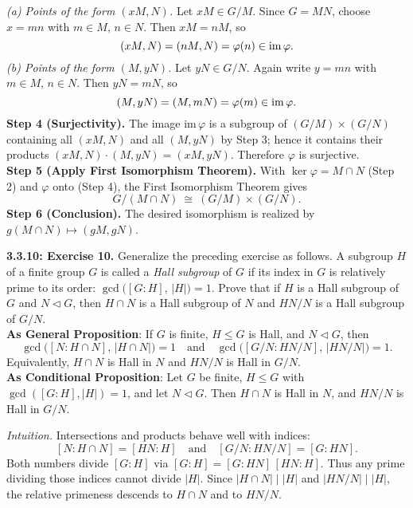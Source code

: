 \documentclass[12pt]{article}
\theoremstyle{definition}
\begin{document}
\quad\textit{(a) Points of the form $(xM,N)$.} Let $xM\in G/M$. Since $G=MN$, choose $x=mn$ with $m\in M$, $n\in N$. Then $xM=nM$, so
\[
(xM,N)=(nM,N)=\varphi(n)\in\mathrm{im}\,\varphi.\\
\]
\quad\textit{(b) Points of the form $(M,yN)$.} Let $yN\in G/N$. Again write $y=mn$ with $m\in M$, $n\in N$. Then $yN=mN$, so
\[
(M,yN)=(M,mN)=\varphi(m)\in\mathrm{im}\,\varphi.\\
\]
\textbf{Step 4 (Surjectivity).} The image $\mathrm{im}\,\varphi$ is a subgroup of $(G/M)\times(G/N)$ containing all $(xM,N)$ and all $(M,yN)$ by Step 3; hence it contains their products $(xM,N)\cdot(M,yN)=(xM,yN)$. Therefore $\varphi$ is surjective.\\
\textbf{Step 5 (Apply First Isomorphism Theorem).} With $\ker\varphi=M\cap N$ (Step 2) and $\varphi$ onto (Step 4), the First Isomorphism Theorem gives
\[
G/(M\cap N)\ \cong\ (G/M)\times(G/N).
\]
\textbf{Step 6 (Conclusion).} The desired isomorphism is realized by $g(M\cap N)\longmapsto (gM,gN)$.\\

\newpage

\newpage

\noindent \textbf{3.3.10: Exercise 10.} Generalize the preceding exercise as follows. A subgroup $H$ of a finite group $G$ is called a \emph{Hall subgroup} of $G$ if its index in $G$ is relatively prime to its order: $\gcd\!\big([G:H],\,|H|\big)=1$. Prove that if $H$ is a Hall subgroup of $G$ and $N\lhd G$, then $H\cap N$ is a Hall subgroup of $N$ and $HN/N$ is a Hall subgroup of $G/N$.\\ %

\noindent\textbf{As General Proposition}: If $G$ is finite, $H\le G$ is Hall, and $N\lhd G$, then
\[
\gcd\!\big([N:H\cap N],\,|H\cap N|\big)=1
\quad\text{and}\quad
\gcd\!\big([G/N:HN/N],\,|HN/N|\big)=1.
\]
Equivalently, $H\cap N$ is Hall in $N$ and $HN/N$ is Hall in $G/N$.\\

\noindent \textbf{As Conditional Proposition}: Let $G$ be finite, $H\le G$ with $\gcd([G:H],|H|)=1$, and let $N\lhd G$. Then $H\cap N$ is Hall in $N$, and $HN/N$ is Hall in $G/N$.\\

\newpage

\dotfill

\emph{Intuition.} Intersections and products behave well with indices:
\[
[N:H\cap N]=[HN:H]\quad\text{and}\quad [G/N:HN/N]=[G:HN].
\]
Both numbers divide $[G:H]$ via $[G:H]=[G:HN]\,[HN:H]$. Thus any prime dividing those indices cannot divide $|H|$. Since $|H\cap N|\mid |H|$ and $|HN/N|\mid |H|$, the relative primeness descends to $H\cap N$ and to $HN/N$.\\
\end{document}
